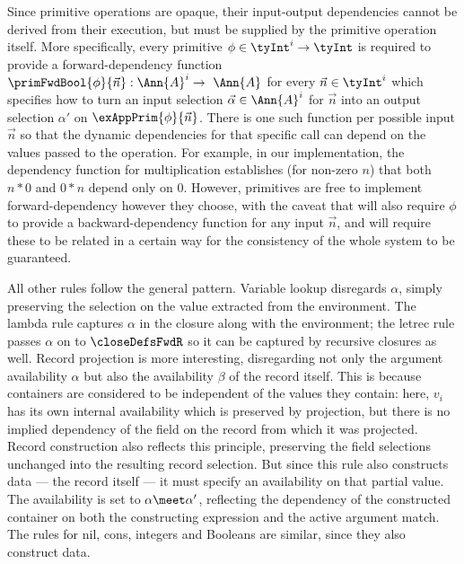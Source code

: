  Since primitive operations are opaque, their input-output dependencies cannot be derived from their execution, but must be supplied by the primitive operation itself. More specifically, every primitive $\phi \in \tyInt^{i} \to \tyInt$ is required to provide a forward-dependency function $\primFwdBool{\phi}{\vec{n}}: \Ann{A}^i \to \Ann{A}$ for every $\vec{n} \in \tyInt^i$ which specifies how to turn an input selection $\vec{\alpha} \in \Ann{A}^i$ for $\vec{n}$ into an output selection $\alpha'$ on $\exAppPrim{\phi}{\vec{n}}$. There is one such function per possible input $\vec{n}$ so that the dynamic dependencies for that specific call can depend on the values passed to the operation. For example, in our implementation, the dependency function for multiplication establishes (for non-zero $n$) that both $n * 0$ and $0 * n$ depend only on $0$. However, primitives are free to implement forward-dependency however they choose, with the caveat that  will also require $\phi$ to provide a backward-dependency function for any input $\vec{n}$, and  will require these to be related in a certain way for the consistency of the whole system to be guaranteed.

 All other rules follow the general pattern. Variable lookup disregards $\alpha$, simply preserving the selection on the value extracted from the environment. The lambda rule captures $\alpha$ in the closure along with the environment; the letrec rule passes $\alpha$ on to $\closeDefsFwdR$ so it can be captured by recursive closures as well. Record projection is more interesting, disregarding not only the argument availability $\alpha$ but also the availability $\beta$ of the record itself. This is because containers are considered to be independent of the values they contain: here, $v_i$ has its own internal availability which is preserved by projection, but there is no implied dependency of the field on the record from which it was projected. Record construction also reflects this principle, preserving the field selections unchanged into the resulting record selection. But since this rule also constructs data --- the record itself --- it must specify an availability on that partial value. The availability is set to $\alpha \meet \alpha'$, reflecting the dependency of the constructed container on both the constructing expression and the active argument match. The rules for nil, cons, integers and Booleans are similar, since they also construct data.

